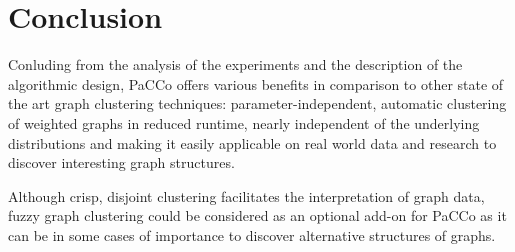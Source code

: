 \documentclass[12pt,journal,compsoc]{IEEEtran}
\numberwithin{equation}{section}
\begin{document}
%



\section{Conclusion}
Conluding from the analysis of the experiments and the description of the algorithmic design, PaCCo offers various benefits in comparison to other state of the art graph clustering techniques: parameter-independent, automatic clustering of weighted graphs in reduced runtime, nearly independent of the underlying distributions and making it easily applicable on real world data and research to discover interesting graph structures.

Although crisp, disjoint clustering facilitates the interpretation of graph data, fuzzy graph clustering \cite{Miyamoto2000} could be considered as an optional add-on for PaCCo as it can be in some cases of importance to discover alternative structures of graphs.
\end{document}
